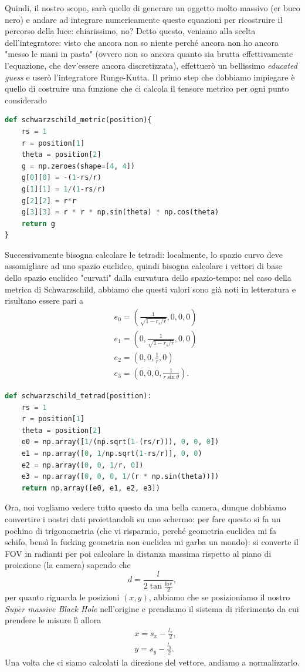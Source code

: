 \documentclass[12pt, twoside, italian]{article}
\begin{document}
	Quindi, il nostro scopo, sarà quello di generare un oggetto molto massivo (er buco nero) e andare ad integrare numericamente queste equazioni per ricostruire il percorso della luce: chiarissimo, no? Detto questo, veniamo alla scelta dell'integratore: visto che ancora non so
	niente perché ancora non ho ancora "messo le mani in pasta" (ovvero non so ancora quanto sia brutta effettivamente l'equazione, che dev'essere ancora discretizzata), effettuerò un bellissimo \emph{educated guess} e userò l'integratore Runge-Kutta. Il primo step che dobbiamo impiegare
	è quello di costruire una funzione che ci calcola il tensore metrico per ogni punto considerado
	\begin{lstlisting}[language=Python]
def schwarzschild_metric(position){
	rs = 1
	r = position[1]
	theta = position[2]
	g = np.zeroes(shape=[4, 4])
	g[0][0] = -(1-rs/r)
	g[1][1] = 1/(1-rs/r)
	g[2][2] = r*r
	g[3][3] = r * r * np.sin(theta) * np.cos(theta)
	return g
}
	\end{lstlisting}
	Successivamente bisogna calcolare le tetradi: localmente, lo spazio curvo deve assomigliare ad uno spazio euclideo, quindi bisogna calcolare i vettori di base dello spazio euclideo "curvati" dalla curvatura dello spazio-tempo: nel caso della metrica di Schwarzschild, abbiamo che questi valori sono già noti in letteratura e risultano essere pari a
	\begin{align}
		&e_0 = (\frac{1}{\sqrt{1-r_s/r}}, 0, 0, 0) \\
		&e_1 = (0, \frac{1}{\sqrt{1-r_s/r}}, 0, 0) \\
		&e_2 = (0, 0, \frac{1}{r}, 0) \\
		&e_3 = (0, 0, 0, \frac{1}{r\sin{\theta}}).
	\end{align}
	\begin{lstlisting}[language=Python]
def schwarzschild_tetrad(position):
	rs = 1
	r = position[1]
	theta = position[2]
	e0 = np.array([1/(np.sqrt(1-(rs/r))), 0, 0, 0])
	e1 = np.array([0, 1/np.sqrt(1-rs/r)], 0, 0)
	e2 = np.array([0, 0, 1/r, 0])
	e3 = np.array([0, 0, 0, 1/(r * np.sin(theta))])
	return np.array([e0, e1, e2, e3])
\end{lstlisting}
	Ora, noi vogliamo vedere tutto questo da una bella camera, dunque dobbiamo convertire i nostri dati proiettandoli su uno schermo: per fare questo si fa un pochino di trigonometria (che vi risparmio, perché geometria euclidea mi fa schifo, bensì la fucking geometria non euclidea mi garba un mondo): si converte il FOV in radianti per poi calcolare la distanza massima rispetto al piano di proiezione (la camera) sapendo che
	$$
		d = \frac{l}{2\tan{\frac{\text{fov}}{2}}},
	$$
	per quanto riguarda le posizioni $(x, y)$, abbiamo che se posizioniamo il nostro \emph{Super massive Black Hole} nell'origine e prendiamo il sistema di riferimento da cui prendere le misure lì allora
	\begin{align*}
		&x = s_x - \frac{l_x}{2}, \\
		&y = s_y - \frac{l_y}{2}.
	\end{align*}
	Una volta che ci siamo calcolati la direzione del vettore, andiamo a normalizzarlo.
\end{document}
